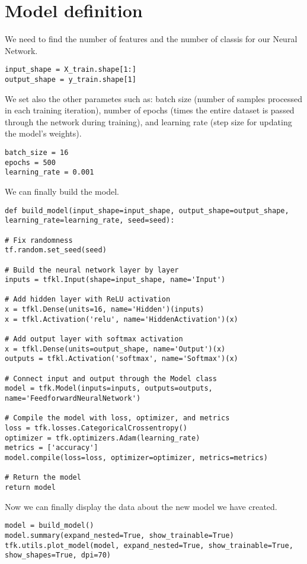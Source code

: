 \section{Model definition}

We need to find the number of features and the number of classis for our Neural Network. 
\begin{lstlisting}[style=Python]
input_shape = X_train.shape[1:]
output_shape = y_train.shape[1]
\end{lstlisting}
We set also the other parametes such as: batch size (number of samples processed in each training iteration), number of epochs (times the entire dataset is passed through the network during training), and learning rate (step size for updating the model's weights). 
\begin{lstlisting}[style=Python]
batch_size = 16
epochs = 500
learning_rate = 0.001
\end{lstlisting}
We can finally build the model.
\begin{lstlisting}[style=Python]
def build_model(input_shape=input_shape, output_shape=output_shape, learning_rate=learning_rate, seed=seed):

# Fix randomness
tf.random.set_seed(seed)

# Build the neural network layer by layer
inputs = tfkl.Input(shape=input_shape, name='Input')

# Add hidden layer with ReLU activation
x = tfkl.Dense(units=16, name='Hidden')(inputs)
x = tfkl.Activation('relu', name='HiddenActivation')(x)

# Add output layer with softmax activation
x = tfkl.Dense(units=output_shape, name='Output')(x)
outputs = tfkl.Activation('softmax', name='Softmax')(x)

# Connect input and output through the Model class
model = tfk.Model(inputs=inputs, outputs=outputs, name='FeedforwardNeuralNetwork')

# Compile the model with loss, optimizer, and metrics
loss = tfk.losses.CategoricalCrossentropy()
optimizer = tfk.optimizers.Adam(learning_rate)
metrics = ['accuracy']
model.compile(loss=loss, optimizer=optimizer, metrics=metrics)

# Return the model
return model
\end{lstlisting}
Now we can finally display the data about the new model we have created. 
\begin{lstlisting}[style=Python]
model = build_model()
model.summary(expand_nested=True, show_trainable=True)
tfk.utils.plot_model(model, expand_nested=True, show_trainable=True, show_shapes=True, dpi=70)
\end{lstlisting}
